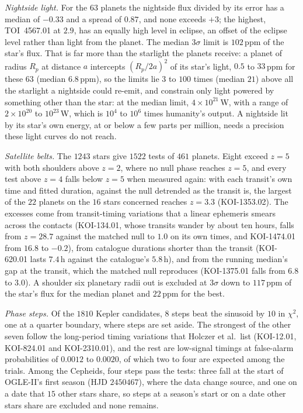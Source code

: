\documentclass[3p,11pt]{elsarticle}
\begin{document}
\emph{Nightside light.} For the $63$ planets the nightside flux divided by its error has
a median of $-0.33$ and a spread of $0.87$, and none exceeds $+3$; the highest, TOI~4567.01
at $2.9$, has an equally high level in eclipse, an offset of the eclipse level rather
than light from the planet. The median $3\sigma$ limit is $102$\,ppm of the star's flux.
That is far more than the starlight the planets receive: a planet of radius $R_p$ at
distance $a$ intercepts $(R_p/2a)^2$ of its star's light, $0.5$ to $33$\,ppm for these
$63$ (median $6.8$\,ppm), so the limits lie $3$ to $100$ times (median $21$) above all
the starlight a nightside could re-emit, and constrain only light powered by something
other than the star: at the median limit, $4\times10^{21}$\,W, with a range of
$2\times10^{20}$ to $10^{23}$\,W, which is $10^{4}$ to $10^{6}$ times humanity's
output. A nightside lit by its star's own energy, at or below a few parts per million,
needs a precision these light curves do not reach.

\emph{Satellite belts.} The $1243$ stars give $1522$ tests of $461$ planets. Eight exceed
$z=5$ with both shoulders above $z=2$, where no null phase reaches $z=5$, and every test
above $z=4$ falls below $z=5$ when measured again: with each transit's own time and fitted
duration, against the null detrended as the transit is, the largest of the $22$ planets
on the $16$ stars concerned reaches $z=3.3$ (KOI-1353.02). The excesses come from
transit-timing variations that a linear ephemeris smears across the contacts (KOI-134.01,
whose transits wander by about ten hours, falls from $z=28.7$ against the matched null to
$1.0$ on its own times, and KOI-1474.01 from $16.8$ to $-0.2$), from catalogue durations
shorter than the transit (KOI-620.01 lasts $7.4$\,h against the catalogue's $5.8$\,h), and
from the running median's gap at the transit, which the matched null reproduces
(KOI-1375.01 falls from $6.8$ to $3.0$). A shoulder six planetary radii out is excluded at
$3\sigma$ down to $117$\,ppm of the star's flux for the median planet and $22$\,ppm for the
best.

\emph{Phase steps.} Of the $1810$ Kepler candidates, $8$ steps beat the sinusoid by $10$
in $\chi^2$, one at a quarter boundary, where steps are set aside. The strongest of the
other seven follow the long-period timing variations that Holczer et al.\ list (KOI-12.01,
KOI-824.01 and KOI-2310.01), and the rest are low-signal timings at false-alarm
probabilities of $0.0012$ to $0.0020$, of which two to four are expected among the
trials. Among the Cepheids, four steps pass the tests: three fall at the start of
OGLE-II's first season (HJD $2450467$), where the data change source, and one on a date
that $15$ other stars share, so steps at a season's start or on a date other stars share
are excluded and none remains.
\end{document}
